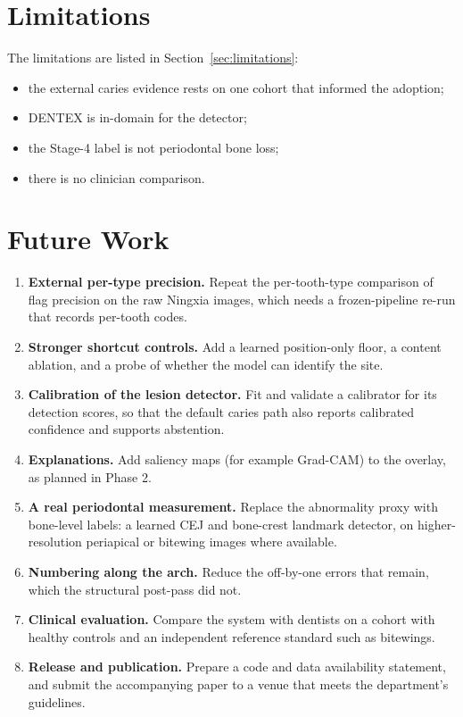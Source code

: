 \section{Limitations}

The limitations are listed in Section~\ref{sec:limitations}:
\begin{itemize}
\item the external caries evidence rests on one cohort that informed the adoption;
\item DENTEX is in-domain for the detector;
\item the Stage-4 label is not periodontal bone loss;
\item there is no clinician comparison.
\end{itemize}

\section{Future Work}

\begin{enumerate}[label=\arabic*.,leftmargin=1.6em]
\item \textbf{External per-type precision.} Repeat the per-tooth-type comparison of flag precision on
  the raw Ningxia images, which needs a frozen-pipeline re-run that records per-tooth codes.
\item \textbf{Stronger shortcut controls.} Add a learned position-only floor, a content ablation, and a
  probe of whether the model can identify the site.
\item \textbf{Calibration of the lesion detector.} Fit and validate a calibrator for its detection
  scores, so that the default caries path also reports calibrated confidence and supports abstention.
\item \textbf{Explanations.} Add saliency maps (for example Grad-CAM) to the overlay, as planned in
  Phase 2.
\item \textbf{A real periodontal measurement.} Replace the abnormality proxy with bone-level labels:
  a learned CEJ and bone-crest landmark detector, on higher-resolution periapical or bitewing images
  where available.
\item \textbf{Numbering along the arch.} Reduce the off-by-one errors that remain, which the structural
  post-pass did not.
\item \textbf{Clinical evaluation.} Compare the system with dentists on a cohort with healthy controls
  and an independent reference standard such as bitewings.
\item \textbf{Release and publication.} Prepare a code and data availability statement, and submit the
  accompanying paper to a venue that meets the department's guidelines.
\end{enumerate}


